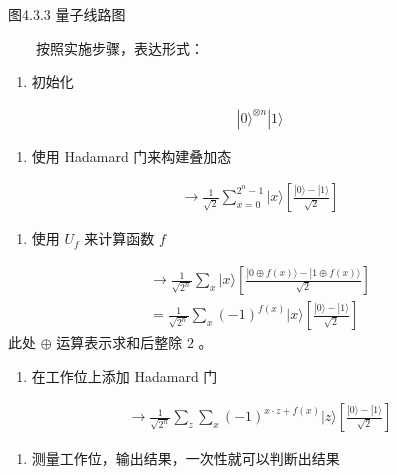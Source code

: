 \documentclass[a4paper,11pt,english]{sphinxmanual}
\begin{document}
\begin{center}图4.3.3 量子线路图
\end{center}
\sphinxAtStartPar
  按照实施步骤，表达形式：
\begin{enumerate}
%
\item {} 
\sphinxAtStartPar
初始化

\end{enumerate}
\begin{equation*}
\begin{split}|0\rangle^{\otimes n}|1\rangle\end{split}
\end{equation*}\begin{enumerate}
%
\setcounter{enumi}{1}
\item {} 
\sphinxAtStartPar
使用 Hadamard 门来构建叠加态

\end{enumerate}
\begin{equation*}
\begin{split}\rightarrow \frac{1}{\sqrt{2}} \sum_{x=0}^{2^{n}-1}|x\rangle\left[\frac{|0\rangle-|1\rangle}{\sqrt{2}}\right]\end{split}
\end{equation*}\begin{enumerate}
%
\setcounter{enumi}{2}
\item {} 
\sphinxAtStartPar
使用  \(U_f\) 来计算函数  \(f\)

\end{enumerate}
\begin{equation*}
\begin{split}\rightarrow \frac{1}{\sqrt{2^{n}}} \sum_{x}|x\rangle\left[\frac{|0\oplus f(x)\rangle-|1\oplus f(x)\rangle}{\sqrt{2}}\right] \\= \frac{1}{\sqrt{2^{n}}} \sum_{x}(-1)^{f(x)}|x\rangle\left[\frac{|0\rangle-|1\rangle}{\sqrt{2}}\right]\end{split}
\end{equation*}
\sphinxAtStartPar
此处 \(\oplus\) 运算表示求和后整除 \(2\) 。
\begin{enumerate}
%
\setcounter{enumi}{3}
\item {} 
\sphinxAtStartPar
在工作位上添加 Hadamard 门

\end{enumerate}
\begin{equation*}
\begin{split}\rightarrow \frac{1}{\sqrt{2^{n}}} \sum_{z} \sum_{x}(-1)^{x \cdot z+f(x)}|z\rangle\left[\frac{|0\rangle-|1\rangle}{\sqrt{2}}\right]\end{split}
\end{equation*}\begin{enumerate}
%
\setcounter{enumi}{4}
\item {} 
\sphinxAtStartPar
测量工作位，输出结果，一次性就可以判断出结果

\end{enumerate}
\end{document}
